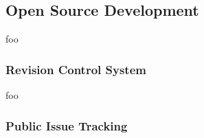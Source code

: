 

\subsection{Open Source Development}




foo


\subsubsection{Revision Control System}


foo


\subsubsection{Public Issue Tracking}


